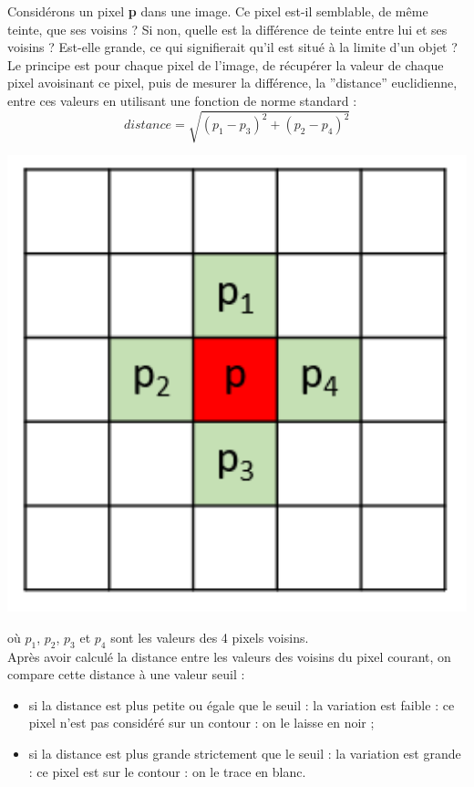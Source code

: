 \documentclass[t,11pt,eleve]{article}
\begin{document}
\begin{minipage}{.7\textwidth}%
Considérons un pixel \textbf{p} dans une image. Ce pixel est-il semblable, de même teinte, que ses voisins ? Si non, quelle est la différence de teinte entre lui et ses voisins ? Est-elle grande, ce qui signifierait qu’il est situé à la limite d’un objet ?\\
Le principe est pour chaque pixel de l'image, de récupérer la valeur de chaque pixel avoisinant ce pixel, puis de mesurer la différence, la ”distance” euclidienne, entre ces valeurs en utilisant une fonction de norme standard :
\begin{equation}
distance=\sqrt{(p_1-p_3)^2+(p_2-p_4)^2}
\end{equation} 

\end{minipage}
\begin{minipage}{.3\textwidth}%
\includegraphics[width=1\textwidth]{imagepixels.png}
\end{minipage}


 où $ p_1$, $p_2$, $ p_3$ et $ p_4$ sont les valeurs des 4 pixels voisins.\\


Après avoir calculé la distance entre les valeurs des voisins du pixel courant, on compare cette distance à une valeur seuil :
\begin{itemize}
\item si la distance est plus petite ou égale que le seuil : la variation est faible : ce pixel n'est pas considéré sur un contour : on le laisse en noir ;
\item si la distance est plus grande strictement que le seuil : la variation est grande : ce pixel est sur le contour : on le trace en blanc.
\end{itemize}
\end{document}
